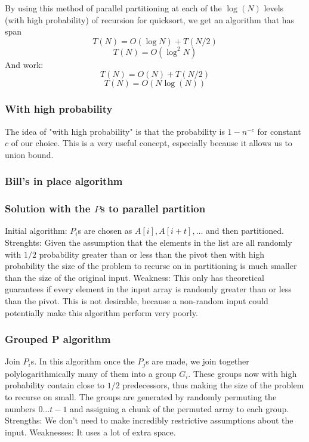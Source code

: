 \documentclass{beamer}
\begin{document}
\begin{frame}
By using this method of parallel partitioning at each of the $\log(N)$ levels (with high probability) of recursion  for quicksort, we get an algorithm that has span 
$$T(N) = O(\log{N})+T(N/2)$$
$$T(N) = O(\log^2 {N})$$
And work: 
$$T(N)=O(N)+T(N/2)$$
$$T(N) = O(N\log(N))$$

\end{frame}

\begin{frame}
\frametitle{With high probability}
The idea of "with high probability" is that the probability is $1-n^{-c}$ for constant $c$ of our choice. This is a very useful concept, especially because it allows us to union bound. 
\end{frame}

\begin{frame}
\frametitle{Bill's in place algorithm}
\end{frame}

\begin{frame}
\frametitle{Solution with the $P$s to parallel partition}
Initial algorithm: $P_i$s are chosen as $A[i],A[i+t],\hdots$ and then partitioned. Strenghts: Given the assumption that the elements in the list are all randomly with $1/2$ probability greater than or less than the pivot then with high probability the size of the problem to recurse on in partitioning is much smaller than the size of the original input. Weakness: This only has theoretical guarantees if every element in the input array is randomly greater than or less than the pivot. This is not desirable, because a non-random input could potentially make this algorithm perform very poorly.
\end{frame}

\begin{frame}
\frametitle{Grouped P algorithm}
Join $P_i$s. In this algorithm once the $P_j$s are made, we join together polylogarithmically many of them into a group $G_i$. These groups now with high probability contain close to $1/2$ predecessors, thus making the size of the problem to recurse on small. The groups are generated by randomly permuting the numbers $0\hdots t-1$ and assigning a chunk of the permuted array to each group. Strengths: We don't need to make incredibly restrictive assumptions about the input. Weaknesses: It uses a lot of extra space. 
\end{frame}
\end{document}
